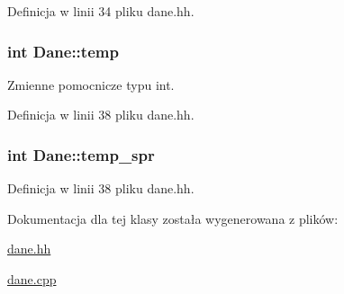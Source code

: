 \-Definicja w linii 34 pliku dane.\-hh.

\hypertarget{class_dane_a4f2d205b1c49da1f5f289a97139d4f6d}{
\subsubsection[{temp}]{\setlength{\rightskip}{0pt plus 5cm}int {\bf \-Dane\-::temp}}}\label{class_dane_a4f2d205b1c49da1f5f289a97139d4f6d}


\-Zmienne pomocnicze typu int. 



\-Definicja w linii 38 pliku dane.\-hh.

\hypertarget{class_dane_a98c7a87fc812e3d3b41e4cb9ee7b105f}{
\subsubsection[{temp\-\_\-spr}]{\setlength{\rightskip}{0pt plus 5cm}int {\bf \-Dane\-::temp\-\_\-spr}}}\label{class_dane_a98c7a87fc812e3d3b41e4cb9ee7b105f}


\-Definicja w linii 38 pliku dane.\-hh.



\-Dokumentacja dla tej klasy została wygenerowana z plików\-:\begin{DoxyCompactItemize}
\item 
\hyperlink{dane_8hh}{dane.\-hh}\item 
\hyperlink{dane_8cpp}{dane.\-cpp}\end{DoxyCompactItemize}
